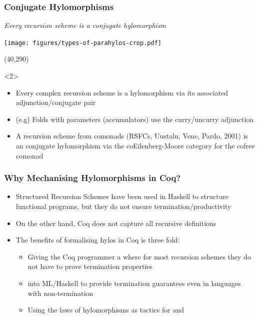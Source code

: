 \begin{frame}[fragile]
  \frametitle{Conjugate Hylomorphisms}
  \centering
  {\Large\emph{Every recursion scheme is a conjugate hylomorphism}}%

  \vspace{.4cm}

  \begin{sticky}\texttt{[image: figures/types-of-parahylos-crop.pdf]}\end{sticky}

  \Put(40,290){%
    \begin{onlyenv}<2>
    \begin{minipage}{.86\columnwidth}
    \begin{greenbox}
      \small
      \begin{itemize}
        \item Every complex recursion scheme is a hylomorphism via its associated adjunction/conjugate pair
        \item (e.g) Folds with parameters (accumulators) use the curry/uncurry adjunction
        \item A recursion scheme from comonads (RSFCs, Uustalu, Vene, Pardo, 2001) is an conjugate hylomorphism via the coEilenberg-Moore category for the cofree comonad
      \end{itemize}
    \end{greenbox}
    \end{minipage}
    \end{onlyenv}
  }
\end{frame}

\begin{frame}
  \frametitle{Why Mechanising Hylomorphisms in Coq?}

  \begin{itemize}
    \item Structured Recursion Schemes have been used in Haskell to structure
      functional programs, but they do not ensure termination/productivity
    \item On the other hand, Coq does not capture all recursive definitions
    \item The benefits of formalising hylos in Coq is three fold:
      \begin{itemize}
        \item Giving the Coq programmer a  where for most
          recursion schemes they do not have to prove termination properties
        \item {} into ML/Haskell to provide termination
          guarantees even in languages with non-termination
        \item Using the laws of hylomorphisms as tactics for  and 
      \end{itemize}
  \end{itemize}
\end{frame}

